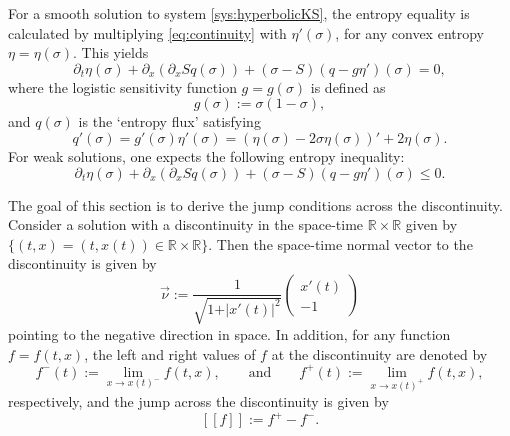 \documentclass[12pt]{article}
\theoremstyle{definition}
\theoremstyle{remark}
\numberwithin{equation}{section}
\begin{document}
For a smooth solution to system \eqref{sys:hyperbolicKS}, the entropy equality is calculated by multiplying \eqref{eq:continuity} with $ \eta'(\sigma) $, for any convex entropy $ \eta = \eta(\sigma) $. This yields 
\begin{equation}
    \label{eq:entropy_equality}
    \partial_t \eta(\sigma) + \partial_x ( \partial_x S q(\sigma) ) + (\sigma-S) (q - g \eta')(\sigma) = 0,  
\end{equation}
where the logistic sensitivity function $ g = g(\sigma) $ is defined as
\begin{equation}
    \label{def:g} 
    g(\sigma):= \sigma (1-\sigma),
\end{equation} 
and $ q(\sigma) $ is the `entropy flux' satisfying
\begin{equation}
    \label{def:q}
    q'(\sigma) = g'(\sigma) \eta'(\sigma)= (\eta(\sigma) - 2\sigma \eta(\sigma))' + 2 \eta(\sigma).
\end{equation}
For weak solutions, one expects the following entropy inequality:
\begin{equation}
    \label{eq:entropy_inequality}
    \partial_t \eta(\sigma) + \partial_x ( \partial_x S q(\sigma) ) + (\sigma-S) (q - g \eta')(\sigma) \leq 0.
\end{equation}


\smallskip 

The goal of this section is to derive the jump conditions across the discontinuity. 
Consider a solution with a discontinuity in the space-time $ \mathbb R \times \mathbb R $ given by $ \lbrace (t,x) = (t, x(t)) \in \mathbb R \times \mathbb R \rbrace $. Then the space-time normal vector to the discontinuity is given by 
\begin{equation}
    \label{def:normal}
    \vec \nu := \frac{1}{\sqrt{1 + \vert x'(t) \vert^2}} \begin{pmatrix}
        x'(t) \\ -1
    \end{pmatrix} 
\end{equation}
pointing to the negative direction in space. In addition, for any function $ f = f(t,x) $, the left and right values of $ f $ at the discontinuity are denoted by
\begin{equation}
    \label{def:l-r-value}
    f^-(t) := \lim_{x \to x(t)^-} f(t,x), \qquad \text{and} \qquad f^+(t) := \lim_{x \to x(t)^+} f(t,x),
\end{equation}
respectively, and the jump across the discontinuity is given by 
\begin{equation}
    \label{def:jump}
    [[f]] := f^+ - f^-. 
\end{equation}
\end{document}
